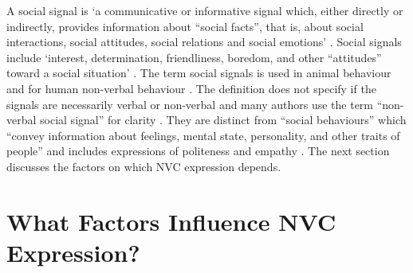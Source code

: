 A social signal is `a communicative or informative signal which, either directly or indirectly, provides information about ``social facts'', that is, about social interactions, social attitudes, social relations and social emotions' \cite{Poggi2011}. Social signals include `interest, determination, friendliness, boredom, and other ``attitudes'' toward a social situation' \cite{Pentland2007}. The term social signals is used in animal behaviour\cite{Lin2005} and for human non-verbal behaviour \cite{Pentland2007}. The definition does not specify if the signals are necessarily verbal or non-verbal and many authors use the term ``non-verbal social signal'' for clarity \cite{Okwechime2011, Vinciarelli2008}. They are distinct from ``social behaviours'' which ``convey information about feelings, mental state, personality, and other traits of people'' and includes expressions of politeness and empathy \cite{Vinciarelli2008}.
The next section discusses the factors on which \ac{NVC} expression depends.

\section{What Factors Influence \ac{NVC} Expression?}
\label{BackgroundWhatFactorsInfluenceNvc}

